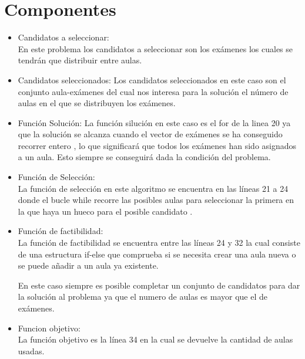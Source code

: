 \documentclass[11pt,openany]{book}
\begin{document}
\section{Componentes}
\begin{itemize}
      \item Candidatos a seleccionar:\\
            En este problema los candidatos a seleccionar son los exámenes 
            los cuales se tendrán que distribuir entre aulas.
      \item Candidatos seleccionados:
            Los candidatos seleccionados en este caso son el conjunto aula-exámenes
            del cual nos interesa para la solución el número de aulas en el que se distribuyen los exámenes.

      \item Función Solución:
            La función silución en este caso es el for de la linea 20
            ya que la solución se alcanza cuando el vector de 
            exámenes se ha conseguido recorrer entero , lo que significará que 
            todos los exámenes han sido asignados a un aula.
            Esto siempre se conseguirá dada la condición del problema.
            

      \item Función de Selección:\\ 
            La función de selección en este algoritmo se encuentra
            en las líneas 21 a 24 donde el bucle while recorre las 
            posibles aulas para seleccionar la primera en la que haya 
            un hueco para el posible candidato .

      \item Función de factibilidad:\\
            La función de factibilidad se encuentra entre las líneas 24 y 32 
            la cual consiste de una estructura if-else que comprueba si se necesita 
            crear una aula nueva o se puede añadir a un aula ya existente.
            
            En este caso siempre es posible completar un conjunto de candidatos para 
            dar la solución al problema ya que el numero de aulas es mayor que el de exámenes.


      \item Funcion objetivo: \\
            La función objetivo es la línea 34 en la cual se devuelve la cantidad de aulas usadas.

\end{itemize}
\end{document}
